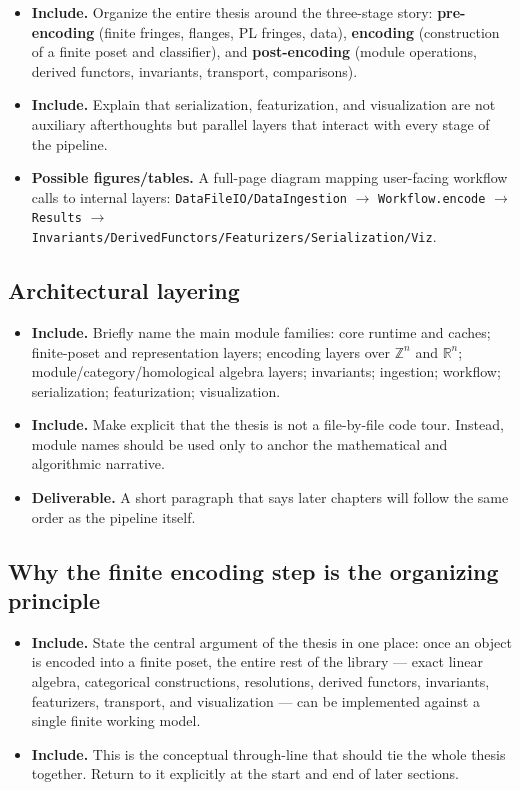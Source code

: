 \documentclass[11pt]{article}
\newcommand{\R}{\mathbb{R}}
\newcommand{\Z}{\mathbb{Z}}
\newenvironment{plan}{\begin{itemize}[leftmargin=1.6em,itemsep=0.35em,topsep=0.25em]}{\end{itemize}}
\newcommand{\includeitems}[1]{\item \textbf{Include.} #1}
\newcommand{\deliverable}[1]{\item \textbf{Deliverable.} #1}
\newcommand{\figures}[1]{\item \textbf{Possible figures/tables.} #1}
\begin{document}
\begin{plan}
    \includeitems{Organize the entire thesis around the three-stage story: \textbf{pre-encoding} (finite fringes, flanges, PL fringes, data), \textbf{encoding} (construction of a finite poset and classifier), and \textbf{post-encoding} (module operations, derived functors, invariants, transport, comparisons).}
    \includeitems{Explain that serialization, featurization, and visualization are not auxiliary afterthoughts but parallel layers that interact with every stage of the pipeline.}
    \figures{A full-page diagram mapping user-facing workflow calls to internal layers: \texttt{DataFileIO/DataIngestion} $\to$ \texttt{Workflow.encode} $\to$ \texttt{Results} $\to$ \texttt{Invariants/DerivedFunctors/Featurizers/Serialization/Viz}.}
\end{plan}

\subsection{Architectural layering}

\begin{plan}
    \includeitems{Briefly name the main module families: core runtime and caches; finite-poset and representation layers; encoding layers over $\Z^n$ and $\R^n$; module/category/homological algebra layers; invariants; ingestion; workflow; serialization; featurization; visualization.}
    \includeitems{Make explicit that the thesis is not a file-by-file code tour. Instead, module names should be used only to anchor the mathematical and algorithmic narrative.}
    \deliverable{A short paragraph that says later chapters will follow the same order as the pipeline itself.}
\end{plan}

\subsection{Why the finite encoding step is the organizing principle}

\begin{plan}
    \includeitems{State the central argument of the thesis in one place: once an object is encoded into a finite poset, the entire rest of the library --- exact linear algebra, categorical constructions, resolutions, derived functors, invariants, featurizers, transport, and visualization --- can be implemented against a single finite working model.}
    \includeitems{This is the conceptual through-line that should tie the whole thesis together. Return to it explicitly at the start and end of later sections.}
\end{plan}
\end{document}

